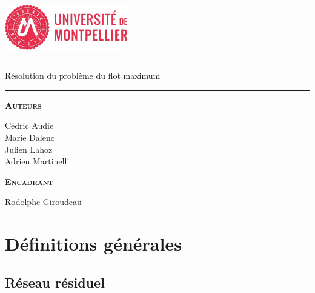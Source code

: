 \documentclass[a4paper]{article}
\begin{document}
\begin{center}
\vspace{2cm}
\includegraphics[width=0.4\textwidth]{UM1.jpg}~\\[1cm]
\vspace{2cm}

\hrule
\vspace{.5cm}
{\huge\bfseries{Résolution du problème du flot maximum\par}} %
\vspace{.5cm}

\hrule
\vspace{1.5cm}

\textsc{\textbf{Auteurs}}\\
\vspace{.5cm}
\centering

Cédric Audie\\
Marie Dalenc\\
Julien Lahoz\\
Adrien Martinelli


\vspace{1cm}

\textsc{\textbf{Encadrant}}\\
\vspace{.5cm}
\centering

Rodolphe Giroudeau

\vspace{4cm}

\centering {} %
\end{center}
\newpage
{\hypersetup{hidelinks}
\tableofcontents
}
\newpage

\section{Définitions générales}
\subsection{Réseau résiduel}
\end{document}
